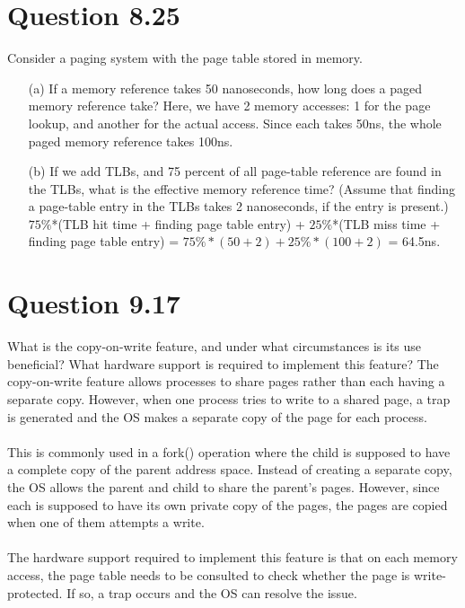 \documentclass[12pt]{article}
\begin{document}
\section*{Question 8.25}{\color{blue}Consider a paging system with the page table stored in memory.
\begin{enumerate}
\item[(a)]If a memory reference takes 50 nanoseconds, how long does a paged memory reference take? {\color{black}
Here, we have 2 memory accesses: 1 for the page lookup, and another for the actual access. Since each takes 50ns, the whole paged memory reference takes 100ns.
}
\item[(b)]If we add TLBs, and 75 percent of all page-table reference are found in the TLBs, what is the effective memory reference time? (Assume that finding a page-table entry in the TLBs takes 2 nanoseconds, if the entry is present.) {\color{black} 
$75\%$*(TLB hit time + finding page table entry) + $25\%$*(TLB miss time + finding page table entry) = $75\%*(50+2) + 25\%*(100+2)$ =  64.5ns.
}
\end{enumerate}
}

\section*{Question 9.17}{\color{blue}What is the copy-on-write feature, and under what circumstances is its use beneficial? What hardware support is required to implement this feature?} The copy-on-write feature allows processes to share pages rather than each having a separate copy. However, when one process tries to write to a shared page, a trap is generated and the OS makes a separate copy of the page for each process. 
\\ \\
This is commonly used in a fork() operation where the child is supposed to have a complete copy of the parent address space. Instead of creating a separate copy, the OS allows the parent and child to share the parent's pages. However, since each is supposed to have its own private copy of the pages, the pages are copied when one of them attempts a write. 
\\ \\
The hardware support required to implement this feature is that on each memory access, the page table needs to be consulted to check whether the page is write-protected. If so, a trap occurs and the OS can resolve the issue.
\end{document}
